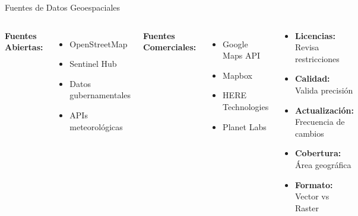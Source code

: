 \documentclass[10pt,aspectratio=169]{beamer}
\newcommand{\conceptbox}[2]{
\begin{tcolorbox}[colframe=usachblue,colback=blue!5,title=#1,fonttitle=\bfseries]
#2
\end{tcolorbox}
}
\begin{document}
\begin{frame}{Fuentes de Datos Geoespaciales}
    \begin{columns}[T]
        \textbf{Fuentes Abiertas:}
        \begin{itemize}
            \item \faGlobe\space OpenStreetMap
            \item \faSatellite\space Sentinel Hub
            \item \faUniversity\space Datos gubernamentales
            \item \faCloud\space APIs meteorológicas
        \end{itemize}
        
        \vspace{0.3cm}
        \textbf{Fuentes Comerciales:}
        \begin{itemize}
            \item \faMapMarkedAlt\space Google Maps API
            \item \faRoute\space Mapbox
            \item \faBuilding\space HERE Technologies
            \item \faImage\space Planet Labs
        \end{itemize}
        
        \conceptbox{Consideraciones Clave}{
            \begin{itemize}
                \item \textbf{Licencias:} Revisa restricciones
                \item \textbf{Calidad:} Valida precisión
                \item \textbf{Actualización:} Frecuencia de cambios
                \item \textbf{Cobertura:} Área geográfica
                \item \textbf{Formato:} Vector vs Raster
            \end{itemize}
        }
    \end{columns}
\end{frame}
\end{document}
